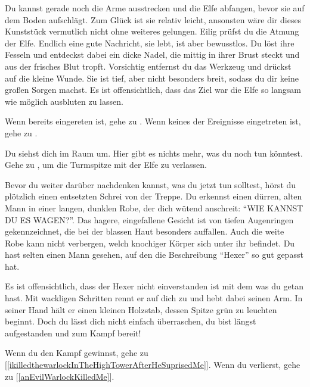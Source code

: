Du kannst gerade noch die Arme ausstrecken und die Elfe abfangen, bevor sie auf dem Boden aufschlägt. Zum Glück ist sie relativ leicht, ansonsten wäre dir dieses Kunststück vermutlich nicht ohne weiteres gelungen. Eilig prüfst du die Atmung der Elfe. Endlich eine gute Nachricht, sie lebt, ist aber bewusstlos. Du löst ihre Fesseln und entdeckst dabei ein dicke Nadel, die mittig in ihrer Brust steckt und aus der frisches Blut tropft. Vorsichtig entfernst du das Werkzeug  und drückst auf die kleine Wunde. Sie ist tief, aber nicht besonders breit, sodass du dir keine großen Sorgen machst. Es ist offensichtlich, dass das Ziel war die Elfe so langsam wie möglich ausbluten zu lassen.

Wenn  bereits eingereten ist, gehe zu . Wenn keines der Ereignisse eingetreten ist, gehe zu .


Du siehst dich im Raum um. Hier gibt es nichts mehr, was du noch tun könntest.
Gehe zu , um die Turmspitze mit der Elfe zu verlassen.


Bevor du weiter darüber nachdenken kannst, was du jetzt tun solltest, hörst du plötzlich einen entsetzten Schrei von der Treppe. Du erkennst einen dürren, alten Mann in einer langen, dunklen Robe, der dich wütend anschreit: ``WIE KANNST DU ES WAGEN?''. Das hagere, eingefallene Gesicht ist von tiefen Augenringen gekennzeichnet, die bei der blassen Haut besonders auffallen. Auch die weite Robe kann nicht verbergen, welch knochiger Körper sich unter ihr befindet. Du hast selten einen Mann gesehen, auf den die Beschreibung ``Hexer'' so gut gepasst hat.

Es ist offensichtlich, dass der Hexer nicht einverstanden ist mit dem was du getan hast. Mit wackligen Schritten rennt er auf dich zu und hebt dabei seinen Arm. In seiner Hand hält er einen kleinen Holzstab, dessen Spitze grün zu leuchten beginnt. Doch du lässt dich nicht einfach überraschen, du bist längst aufgestanden und zum Kampf bereit!

\monsterWarlock

Wenn du den Kampf gewinnst, gehe zu [\ref{ikilledthewarlockInTheHighTowerAfterHeSuprisedMe}].
Wenn du verlierst, gehe zu [\ref{anEvilWarlockKilledMe}].


